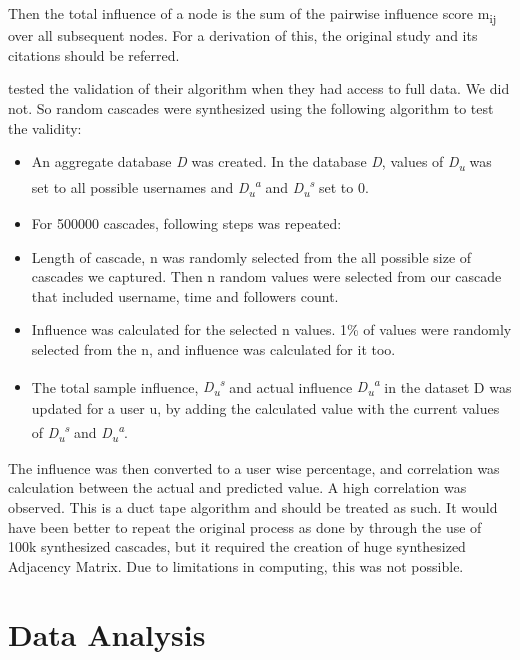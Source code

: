 \documentclass[letterpaper]{article}
\begin{document}
Then the total influence of a node is the sum of the pairwise influence score m\textsubscript{ij} over all subsequent nodes. For a derivation of this, the original study
 \cite{rizoiu2018debatenight} and its citations should be referred. \par

 \cite{rizoiu2018debatenight} tested the validation of their algorithm when they had access to full data. We did not. So random cascades were synthesized using the following algorithm 
 to test the validity:
 
 \begin{itemize}
    \item An aggregate database \textit{D} was created. In the database \textit{D}, values of \textit{D\textsubscript{u}} was set to all possible usernames  and \textit{D\textsubscript{u}\textsuperscript{a}}
     and \textit{D\textsubscript{u}\textsuperscript{s}} set to 0.
    \item For 500000 cascades, following steps was repeated:
    \setlength{\itemindent}{+.3in}
    \item Length of cascade, n was randomly selected from the all possible size of cascades we captured. Then n random values were selected from our cascade that included 
    username, time and followers count.
    \item Influence was calculated for the selected n values. 1\% of values were randomly selected from the n, and influence was calculated for it too.
    \item The total sample influence, \textit{D\textsubscript{u}\textsuperscript{s}} and actual influence \textit{D\textsubscript{u}\textsuperscript{a}} in the dataset D was updated for a user u,
    by adding the calculated value with the current values of \textit{D\textsubscript{u}\textsuperscript{s}} and \textit{D\textsubscript{u}\textsuperscript{a}}.
 \end{itemize}

 The influence was then converted to a user wise percentage, and correlation was calculation between the actual and predicted value. A high correlation was observed. 
 This is a duct tape algorithm and should be treated as such. It would have been better to repeat the original process as done by \cite{rizoiu2018debatenight} through the use of 
 100k synthesized cascades, but it required the creation of huge synthesized Adjacency Matrix. Due to limitations in computing, this was not possible.

 \section{Data Analysis}
\label{sec:analysis}
\end{document}
